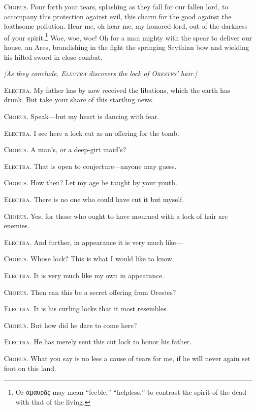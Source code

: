 \documentclass[12pt]{article}
\begin{document}
\textsc{Chorus.} Pour forth your tears, splashing as they fall for our fallen lord, to accompany this protection against evil, this charm for the good against the loathsome pollution. Hear me, oh hear me, my honored lord, out of the darkness of your spirit.\footnote{Or ἀμαυρᾶς may mean ``feeble,'' ``helpless,'' to contrast the spirit of the dead with that of the living.} Woe, woe, woe! Oh for a man mighty with the spear to deliver our house, an Ares, brandishing in the fight the springing Scythian bow and wielding his hilted sword in close combat.

\begin{center}
\textit{[As they conclude, \textsc{Electra} discovers the lock of \textsc{Orestes'} hair.]}
\end{center}

\textsc{Electra.} My father has by now received the libations, which the earth has drunk. But take your share of this startling news.

\textsc{Chorus.} Speak---but my heart is dancing with fear.

\textsc{Electra.} I see here a lock cut as an offering for the tomb.

\textsc{Chorus.} A man's, or a deep-girt maid's?

\textsc{Electra.} That is open to conjecture---anyone may guess.

\textsc{Chorus.} How then? Let my age be taught by your youth.

\textsc{Electra.} There is no one who could have cut it but myself.

\textsc{Chorus.} Yes, for those who ought to have mourned with a lock of hair are enemies.

\textsc{Electra.} And further, in appearance it is very much like---

\textsc{Chorus.} Whose lock? This is what I would like to know.

\textsc{Electra.} It is very much like my own in appearance.

\textsc{Chorus.} Then can this be a secret offering from Orestes?

\textsc{Electra.} It is his curling locks that it most resembles.

\textsc{Chorus.} But how did he dare to come here?

\textsc{Electra.} He has merely sent this cut lock to honor his father.

\textsc{Chorus.} What you say is no less a cause of tears for me, if he will never again set foot on this land.
\end{document}
